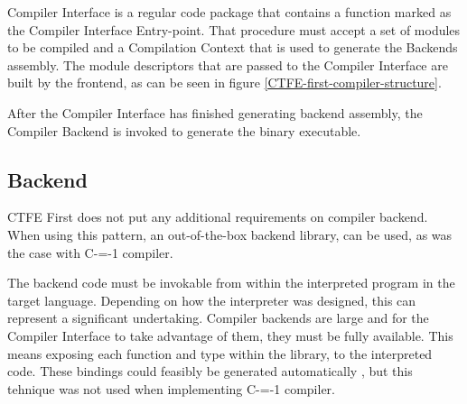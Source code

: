 Compiler Interface is a regular code package that contains a function marked as the Compiler Interface Entry-point.
That procedure must accept a set of modules to be compiled and a Compilation Context that is used to generate the Backends assembly.
The module descriptors that are passed to the Compiler Interface are built by the frontend, as can be seen in figure \ref{CTFE-first-compiler-structure}.

After the Compiler Interface has finished generating backend assembly, the Compiler Backend is invoked to generate the binary executable.
\subsection{Backend}
\label{backend}

CTFE First does not put any additional requirements on compiler backend.
When using this pattern, an out-of-the-box backend library, can be used, as was the case with C-=-1 compiler.

The backend code must be invokable from within the interpreted program in the target language.
Depending on how the interpreter was designed, this can represent a significant undertaking.
Compiler backends are large and for the Compiler Interface to take advantage of them, they must be fully available.
This means exposing each function and type within the library, to the interpreted code.
These bindings could feasibly be generated automatically \cite{marshalling_auto_generation}, but this tehnique was not used when implementing C-=-1 compiler.
